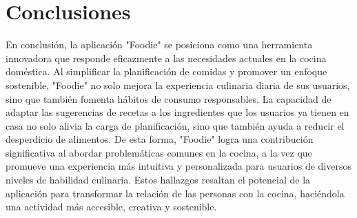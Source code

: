 \documentclass[a4paper,12pt]{article}
\begin{document}
\section*{Conclusiones}
En conclusión, la aplicación "Foodie" se posiciona como una herramienta innovadora que responde eficazmente a las necesidades actuales en la cocina doméstica. Al simplificar la planificación de comidas y promover un enfoque sostenible, "Foodie" no solo mejora la experiencia culinaria diaria de sus usuarios, sino que también fomenta hábitos de consumo responsables. La capacidad de adaptar las sugerencias de recetas a los ingredientes que los usuarios ya tienen en casa no solo alivia la carga de planificación, sino que también ayuda a reducir el desperdicio de alimentos. De esta forma, "Foodie" logra una contribución significativa al abordar problemáticas comunes en la cocina, a la vez que promueve una experiencia más intuitiva y personalizada para usuarios de diversos niveles de habilidad culinaria. Estos hallazgos resaltan el potencial de la aplicación para transformar la relación de las personas con la cocina, haciéndola una actividad más accesible, creativa y sostenible.

\cite{Blumenthal2008}
\cite{Dingtang2020}
\cite{Faure2019}
\cite{Hernandez2019}
\cite{McGee2004}
\cite{Moreno2024}
\cite{Pinanjota2023}
\cite{Sampayo2016}
\cite{Socas2019}
\cite{Valenzuela2024}
\printbibliography
\end{document}
